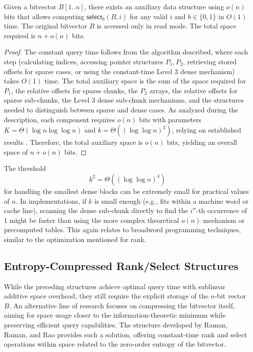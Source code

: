 \begin{theorem} \label{th:select}
    Given a bitvector $B[1..n]$, there exists an auxiliary data structure using $o(n)$ bits that allows computing $\textsf{select}_b(B, i)$ for any valid $i$ and $b \in \{0,1\}$ in $O(1)$ time. The original bitvector $B$ is accessed only in read mode. The total space required is $n + o(n)$ bits.
\end{theorem}
\begin{proof}
    The constant query time follows from the algorithm described, where each step (calculating indices, accessing pointer structures $P_1, P_2$, retrieving stored offsets for sparse cases, or using the constant-time Level 3 dense mechanism) takes $O(1)$ time. The total auxiliary space is the sum of the space required for $P_1$, the relative offsets for sparse chunks, the $P_2$ arrays, the relative offsets for sparse sub-chunks, the Level 3 dense sub-chunk mechanisms, and the structures needed to distinguish between sparse and dense cases. As analyzed during the description, each component requires $o(n)$ bits with parameters $K=\Theta(\log n \log \log n)$ and $k=\Theta((\log \log n)^2)$, relying on established results \cite{clark1997compact}. Therefore, the total auxiliary space is $o(n)$ bits, yielding an overall space of $n+o(n)$ bits.
\end{proof}

\begin{remark}
    The threshold
    \[k^2 = \Theta((\log \log n)^4)\]
    for handling the smallest dense blocks can be extremely small for practical values of $n$. In implementations, if $k$ is small enough (e.g., fits within a machine word or cache line), scanning the dense sub-chunk directly to find the $i''$-th occurrence of 1 might be faster than using the more complex theoretical $o(n)$ mechanism or precomputed tables. This again relates to broadword programming techniques, similar to the optimization mentioned for \textsf{rank}.
\end{remark}

\subsection{Entropy-Compressed Rank/Select Structures} \label{subsec:rrr}

While the preceding structures achieve optimal query time with sublinear additive space overhead, they still require the explicit storage of the $n$-bit vector $B$. An alternative line of research focuses on compressing the bitvector itself, aiming for space usage closer to the information-theoretic minimum while preserving efficient query capabilities. The structure developed by Raman, Raman, and Rao \cite{RRR2002} provides such a solution, offering constant-time \textsf{rank} and \textsf{select} operations within space related to the zero-order entropy of the bitvector.

